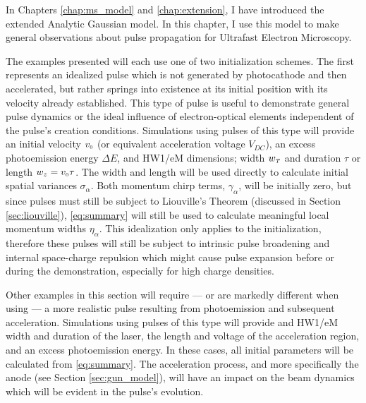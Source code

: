
In Chapters \ref{chap:ms_model} and \ref{chap:extension}, I have introduced the extended Analytic Gaussian model.
In this chapter, I use this model to make general observations about pulse propagation for Ultrafast Electron Microscopy.

The examples presented will each use one of two initialization schemes.
The first represents an idealized pulse which is not generated by photocathode and then accelerated, but rather springs into existence at its initial position with its velocity already established.
This type of pulse is useful to demonstrate general pulse dynamics or the ideal influence of electron-optical elements independent of the pulse's creation conditions.
Simulations using pulses of this type will provide an initial velocity $v_{{\scriptscriptstyle 0}}$ (or equivalent acceleration voltage $V_{DC}$), an excess photoemission energy $\Delta E$, and HW1/eM dimensions; width $w_{{\scriptscriptstyle T}}$ and duration $\tau$ or length $ w_z = v_{{\scriptscriptstyle 0}} \tau$.
The width and length will be used directly to calculate initial spatial variances $\sigma_{\alpha}$.
Both momentum chirp terms, $\gamma_{\alpha}$, will be initially zero, but since pulses must still be subject to Liouville's Theorem (discussed in Section \ref{sec:liouville}), \ref{eq:summary} will still be used to calculate meaningful local momentum widths $\eta_{\alpha}$.
This idealization only applies to the initialization, therefore these pulses will still be subject to intrinsic pulse broadening and internal space-charge repulsion which might cause pulse expansion before or during the demonstration, especially for high charge densities.

Other examples in this section will require --- or are markedly different when using --- a more realistic pulse resulting from photoemission and subsequent acceleration.
Simulations using pulses of this type will provide and HW1/eM width and duration of the laser, the length and voltage of the acceleration region, and an excess photoemission energy.
In these cases, all initial parameters will be calculated from \ref{eq:summary}.
The acceleration process, and more specifically the anode (see Section \ref{sec:gun_model}), will have an impact on the beam dynamics which will be evident in the pulse's evolution.

